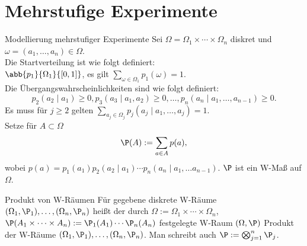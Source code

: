 \section*{Mehrstufige Experimente}

\begin{karte}{Modellierung mehrstufiger Experimente}
	Sei \( \Omega = \Omega_1 \times \cdots \times \Omega_n \) diskret und 
	\( \omega = (a_1, \ldots, a_n) \in \Omega \).\\
	Die Startverteilung ist wie folgt definiert: \\
	\( \abb{p_1}{\Omega_1}{[0,1]} \), es gilt \( \sum_{\omega\in \Omega_1} p_1(\omega) = 1 \).\\
	Die Übergangswahrscheinlichkeiten sind wie folgt definiert: 
	\[ p_2(a_2 \;|\; a_1) \geq 0, p_3(a_3 \;|\; a_1, a_2) \geq 0, \ldots, 
	p_n(a_n \;|\; a_1,\ldots,a_{n-1}) \geq 0. \]
	Es muss für \(j \geq 2\) gelten
	\( \sum_{a_j \in \Omega_j} p_j(a_j \;|\; a_1,\ldots,a_j) = 1 \).\\
	Setze für \(A \subset \Omega \)
	\[ \P(A) := \sum_{a \in A} p(a), \]
	wobei \( p(a) = p_1(a_1) p_2(a_2 \;|\; a_1) 
	\cdots p_n(a_n \;|\; a_1,\ldots a_{n-1}) \). 
	\(\P\) ist ein W-Maß auf \(\Omega\).
\end{karte}

\begin{karte}{Produkt von W-Räumen}
	Für gegebene diskrete W-Räume \( (\Omega_1, \P_1),\ldots, (\Omega_n, \P_n) \)
	heißt der durch \( \Omega := \Omega_1 \times \cdots \times \Omega_n \), 
	\( \P(A_1 \times \cdots \times A_n) := \P_1(A_1) \cdots \P_n(A_n) \)
	festgelegte W-Raum \((\Omega, \P)\) Produkt der W-Räume 
	\( (\Omega_1, \P_1),\ldots, (\Omega_n, \P_n) \).
	Man schreibt auch \( \P := \bigotimes_{j=1}^n \P_j \).
\end{karte}